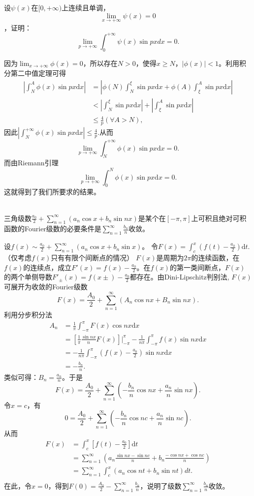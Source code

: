 \begin{exercise}
  设$\psi(x)$在$[0,+\infty)$上连续且单调，$$\displaystyle\lim_{x\rightarrow+\infty}\psi(x)=0$$，证明：$$\displaystyle\lim_{p\rightarrow+\infty}\int_0^{+\infty}\psi(x)\sin pxdx=0.$$  
  
 因为$\lim_{x\rightarrow+\infty}\phi(x)=0$，所以存在$N>0$，使得$x\geq N$，$|\phi(x)|<1$。利用积分第二中值定理可得
\begin{align*}
|\int_N^A\phi(x)\sin px\mathrm{d}x|&=|\phi(N)\int_N^{\xi}\sin px\mathrm{d}x+\phi(A)\int_{\xi}^A\sin px\mathrm{d}x|\\
&<|\int_N^{\xi}\sin px\mathrm{d}x|+|\int_{\xi}^A\sin px\mathrm{d}x|\\
&\leq\frac{4}{p}(\forall A>N),
\end{align*}
因此$|\int_N^{+\infty}\phi(x)\sin px\mathrm{d}x|\leq\frac{4}{p}.$从而
$$\lim_{p\rightarrow+\infty}\int_N^{+\infty}\phi(x)\sin px\mathrm{d}x=0.$$
而由Riemann引理
$$\lim_{p\rightarrow+\infty}\int_0^N\phi(x)\sin px\mathrm{d}x=0.$$
这就得到了我们所要求的结果。 
  \end{exercise}

  \begin{exercise}
  \hfill\\
 三角级数$\displaystyle\frac{a_0}2+\sum_{n=1}^{\infty}(a_n\cos x+b_n\sin nx)$是某个在$[-\pi,\pi]$上可积且绝对可积函数的Fourier级数的必要条件是$\displaystyle\sum_{n=1}^{\infty}\frac{b_n}n$收敛。  
  
  设$f(x)\sim\frac{a_0}{2}+\sum_{n=1}^{\infty}(a_n\cos x+b_n\sin x)$。
  令$F(x)=\int_c^x(f(t)-\frac{a_0}{2})\mathrm{d}t.$（仅考虑$f(x)$只有有限个间断点的情况）
  $F(x)$是周期为$2\pi$的连续函数，在$f(x)$的连续点，成立$F'(x)=f(x)-\frac{a_0}{2}$。在$f(x)$的第一类间断点，$F(x)$的两个单侧导数$F'_{\pm}(x)=f(x\pm)-\frac{a_0}{2}$都存在。由Dini-Lipschitz判别法, $F(x)$可展开为收敛的Fourier级数$$F(x)=\frac{A_0}{2}+\sum_{n=1}^{\infty}(A_n\cos nx+B_n\sin nx).$$
  利用分步积分法
  \begin{align*}
  A_n&=\frac{1}{\pi}\int_{-\pi}^{\pi}F(x)\cos nx\mathrm{d}x\\
  &=[\frac{1}{\pi}\frac{\sin nx}{n}F(x)]|_{-\pi}^{\pi}-\frac{1}{n\pi}\int_{-\pi}^{\pi}f(x)\sin nx\mathrm{d}x\\
  &=-\frac{1}{n\pi}\int_{-\pi}^{\pi}(f(x)-\frac{a_0}{2})\sin nx\mathrm{d}x\\
  &=-\frac{b_n}{n}.
  \end{align*}
  类似可得：$B_n=\frac{a_n}{n}$。于是$$F(x)=\frac{A_0}{2}+\sum_{n=1}^{\infty}(-\frac{b_n}{n}\cos nx+\frac{a_n}{n}\sin nx).$$
  令$x=c$，有
  $$0=\frac{A_0}{2}+\sum_{n=1}^{\infty}(-\frac{b_n}{n}\cos nc+\frac{a_n}{n}\sin nc).$$
  从而
  \begin{align*}
  F(x)&=\int_c^x[f(t)-\frac{a_0}{2}]\mathrm{d}t\\
  &=\sum_{n=1}^{\infty}(a_n\frac{\sin nx-\sin nc}{n}+b_n\frac{-\cos nx+\cos nc}{n})\\
  &=\sum_{n=1}^{\infty}\int_c^x(a_n\cos nt+b_n\sin nt)dt.\\
  \end{align*}
  在此，令$x=0$，得到$F(0)=\frac{A_0}{2}-\sum_{n=1}^{\infty}\frac{b_n}{n}$，说明了级数$\sum_{n=1}^{\infty}\frac{b_n}{n}$收敛。  
  \end{exercise}


